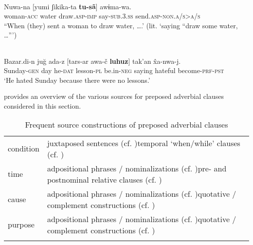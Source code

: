 \documentclass[output=paper]{langsci/langscibook}
\begin{document}
\ea\label{ex:diessel:15}
\\
\gll   Nuwa-na  [yumi  ʃikika-ta  \textbf{tu-sã}]  awɨma-wa.\\
       woman-\textsc{acc}  water  draw.\textsc{asp-imp}  say-\textsc{sub.3.ss}  send.\textsc{asp-non.a/s>a/s}\\
\glt “When (they) sent a woman to draw water, ….' (lit. ‘saying “draw some water, …”’) 
\z

\ea\label{ex:diessel:16}
\\
\gll   Bazar.di-n  juğ  ada-z  [tars-ar  awa-č   \textbf{luhuz}]  tak’an  \^{x}a-nwa-j.\\
       Sunday-\textsc{gen}  day  he-\textsc{dat}  lesson-\textsc{pl}  be.in-\textsc{neg}   saying  hateful  become-\textsc{prf-pst}\\
\glt   `He hated Sunday because there were no lessons.'
\z

 provides an overview of the various sources for preposed adverbial clauses considered in this section.

\begin{table}
\begin{tabularx}{\textwidth}{lQ}
\lsptoprule
condition & juxtaposed sentences (cf. \citealt{Haiman1985})\newline 	  temporal ‘when/while’ clauses (cf. \citealt{Traugott1985})\\
\tablevspace
time      & adpositional phrases / nominalizations (cf. \citealt{Genetti1991})\newline 	  pre- and postnominal relative clauses (cf. \citealt{Givón1991})\\
\tablevspace
cause    &  adpositional phrases / nominalizations (cf. \citealt{Genetti1991})\newline 	  quotative / complement constructions (cf. \citealt{Ebert1991})\\
\tablevspace
purpose &  adpositional phrases / nominalizations (cf. \citealt{Schmidtke-Bode2009})\newline  quotative / complement constructions (cf. \citealt{Güldemann2008})\\
\lspbottomrule
\end{tabularx}

\caption{Frequent source constructions of preposed adverbial clauses}
\label{tab:diessel:4}
\end{table}
\end{document}
